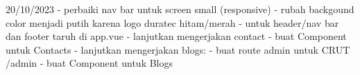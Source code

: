 20/10/2023
    - perbaiki nav bar untuk screen small (responsive)
    - rubah backgound color menjadi putih karena logo duratec hitam/merah 
    - untuk header/nav bar dan footer taruh di app.vue
    - lanjutkan mengerjakan contact
         - buat Component untuk Contacts
    - lanjutkan mengerjakan blogs:
        - buat route admin untuk CRUT   /admin
        - buat Component untuk Blogs
    